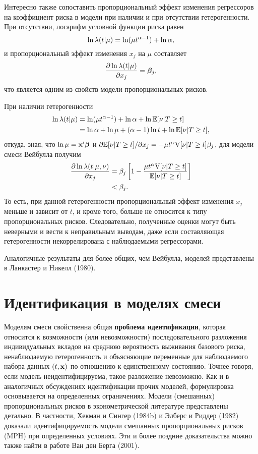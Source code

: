 Интересно также сопоставить пропорциональный эффект изменения регрессоров на коэффициент риска в модели при наличии и при отсутствии гетерогенности. При отсутствии, логарифм условной функции риска равен
    $$\ln\lambda(t|\mu) = \ln(\mu t^{\alpha-1}) + \ln\alpha,$$
и пропорциональный эффект изменения $x_j$ на $\mu$ составляет
    $$\frac{\partial\ln\lambda(t|\mu)}{\partial x_j} = \bm{\beta}_j,$$
что является одним из свойств модели пропорциональных рисков.

При наличии гетерогенности
    \begin{align}
        \ln\lambda(t|\mu) &= \ln(\mu t^{\alpha-1}) + \ln\alpha + \ln\mathbb{E}[\nu|T\ge t] \notag \\
                      &= \ln\alpha + \ln\mu + (\alpha-1)\ln t + \ln\mathbb{E}[\nu|T\ge t], \notag
    \end{align}
откуда, зная, что $\ln\mu = \mathbf{x}'\bm{\beta}$ и $\partial\mathbb{E}[\nu|T\ge t]/\partial x_j = -\mu t^{\alpha}\mathrm{V}[\nu|T\ge t]\beta_j$, для модели смеси Вейбулла получим
    \begin{align}
        \label{eq:18.16}
        \frac{\partial\ln\lambda(t|\mu,\nu)}{\partial x_j} &= \beta_j \left[ 1 - \frac{\mu t^\alpha \mathrm{V}[\nu|T\ge t]}{\mathbb{E}[\nu|T\ge t]} \right] \\
                                             &< \beta_j. \notag
    \end{align}
То есть, при данной гетерогенности пропорциональный эффект изменения $x_j$ меньше и зависит от $t$, и кроме того, больше не относится к типу пропорциональных рисков. Следовательно, полученные оценки могут быть неверными и вести к неправильным выводам, даже если составляющая  гетерогенности некоррелирована с наблюдаемыми регрессорами.

Аналогичные результаты для более общих, чем Вейбулла, моделей представлены в Ланкастер и Никелл (1980).




\section{Идентификация в моделях смеси}\label{sec:18.3}

\noindent
Моделям смеси свойственна общая \textbf{проблема идентификации}, которая относится к возможности (или невозможности) последовательного разложения индивидуальных вкладов на среднюю вероятность выживания базового риска, ненаблюдаемую гетерогенность и объясняющие переменные для наблюдаемого набора данных $(t,\mathbf{x})$ по отношению к единственному состоянию. Точнее говоря, если модель неидентифицируема, такое разложение невозможно. Как и в аналогичных обсуждениях идентификации прочих моделей, формулировка
основывается на определенных ограничениях. Модели (смешанных) пропорциональных рисков в эконометрической литературе представлены детально. В частности, Хекман и Cингер (1984b) и Элберс и Риддер (1982) доказали идентифицируемость модели смешанных пропорциональных рисков (MPH) при определенных условиях. Эти и более поздние доказательства можно также найти в работе Ван ден Берга (2001).

